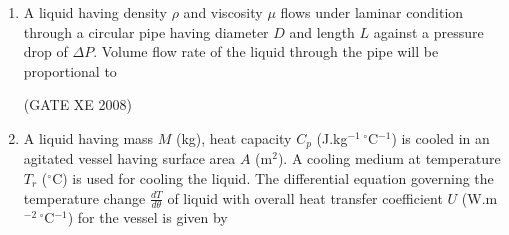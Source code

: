 \documentclass[12pt]{article}
\begin{document}
\begin{enumerate}
\begin{enumerate}
\end{enumerate}

(GATE XE 2008)  

\item A liquid having density $\rho$ and viscosity $\mu$ flows under laminar condition through a circular pipe having diameter $D$ and length $L$ against a pressure drop of $\Delta P$. Volume flow rate of the liquid through the pipe will be proportional to  

\begin{enumerate}
\end{enumerate}

(GATE XE 2008)  

\item  A liquid having mass $M$ (kg), heat capacity $C_p$ (J.kg$^{-1} \, ^\circ$C$^{-1}$) is cooled in an agitated vessel having surface area $A$ (m$^2$). A cooling medium at temperature $T_r$ ($^\circ$C) is used for cooling the liquid. The differential equation governing the temperature change $\frac{dT}{d\theta}$ of liquid with overall heat transfer coefficient $U$ (W.m$^{-2} \, ^\circ$C$^{-1}$) for the vessel is given by  

\begin{enumerate}
\end{enumerate}


\end{enumerate}
\end{document}
